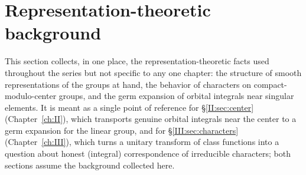 \section{Representation-theoretic background}\label{gl:reptheory}
This section collects, in one place, the representation-theoretic
facts used throughout the series but not specific to any one
chapter: the structure of smooth representations of the groups at
hand, the behavior of characters on compact-modulo-center groups,
and the germ expansion of orbital integrals near singular elements.
It is meant as a single point of reference for \S\ref{II:sec:center}
(Chapter~\ref{ch:II}), which transports genuine orbital integrals
near the center to a germ expansion for the linear group, and for
\S\ref{III:sec:characters} (Chapter~\ref{ch:III}), which turns a
unitary transform of class functions into a question about honest
(integral) correspondence of irreducible characters; both sections
assume the background collected here.
